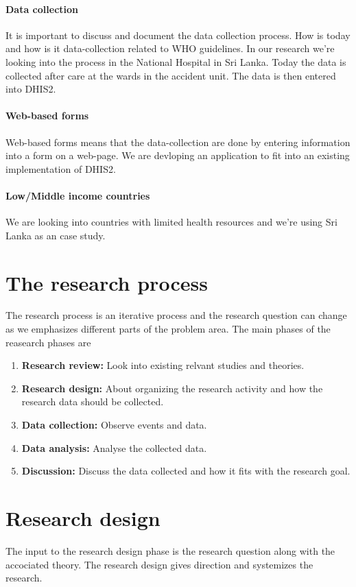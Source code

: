 \documentclass[UKenglish, 12pt]{article}
\begin{document}
\paragraph*{Data collection} 
It is important to discuss and document the data collection process. How is today and how is it data-collection related to WHO guidelines. In our research we're looking into the process in the National Hospital in Sri Lanka. Today the data is collected after care at the wards in the accident unit. The data is then entered into DHIS2.

\paragraph*{Web-based forms}
Web-based forms means that the data-collection are done by entering information into a form on a web-page. We are devloping an application to fit into an existing implementation of DHIS2.

\paragraph*{Low/Middle income countries}
We are looking into countries with limited health resources and we're using Sri Lanka as an case study.
 

 \section*{The research process}
 The research process is an iterative process and the research question can change as we emphasizes different parts of the problem area. The main phases of the reasearch phases are
 \begin{enumerate}
 \item \textbf{Research review:} Look into existing relvant studies and theories.
 \item \textbf{Research design:} About organizing the research activity and how the research data should be collected.
 \item \textbf{Data collection:} Observe events and data.
 \item \textbf{Data analysis:} Analyse the collected data.
 \item \textbf{Discussion:} Discuss the data collected and how it fits with the research goal.
 \end{enumerate}

\section*{Research design}
The input to the research design phase is the research question along with the accociated theory. The research design gives direction and systemizes the research.
\end{document}
